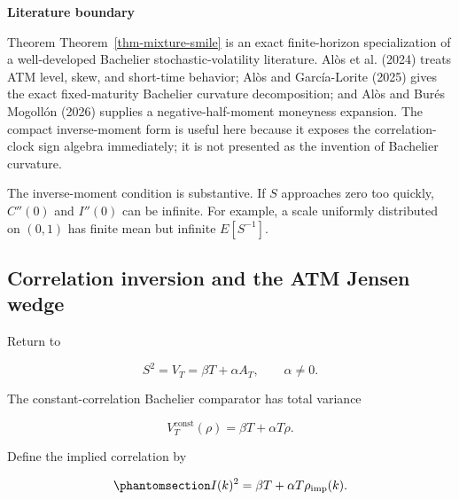 \documentclass[
  english,
  11pt,
  letterpaper,
  DIV=11,
  numbers=noendperiod]{scrartcl}
\theoremstyle{plain}
\theoremstyle{plain}
\theoremstyle{plain}
\theoremstyle{plain}
\theoremstyle{remark}
\begin{document}
\begin{tcolorbox}[enhanced jigsaw, arc=.35mm, bottomrule=.15mm, breakable, colback=white, colframe=quarto-callout-important-color-frame, left=2mm, leftrule=.75mm, opacityback=0, rightrule=.15mm, toprule=.15mm]
\begin{minipage}[t]{5.5mm}
\textcolor{quarto-callout-important-color}{\faExclamation}
\end{minipage}%
\begin{minipage}[t]{\textwidth - 5.5mm}

\vspace{-3mm}\textbf{Literature boundary}\vspace{3mm}

Theorem Theorem~\ref{thm-mixture-smile} is an exact finite-horizon
specialization of a well-developed Bachelier stochastic-volatility
literature. Alòs et al. (2024) treats ATM level, skew, and short-time
behavior; Alòs and García-Lorite (2025) gives the exact fixed-maturity
Bachelier curvature decomposition; and Alòs and Burés Mogollón (2026)
supplies a negative-half-moment moneyness expansion. The compact
inverse-moment form is useful here because it exposes the
correlation-clock sign algebra immediately; it is not presented as the
invention of Bachelier curvature.

\end{minipage}%
\end{tcolorbox}

The inverse-moment condition is substantive. If \(S\) approaches zero
too quickly, \(C''(0)\) and \(I''(0)\) can be infinite. For example, a
scale uniformly distributed on \((0,1)\) has finite mean but infinite
\(E[S^{-1}]\).

\subsection{Correlation inversion and the ATM Jensen
wedge}\label{correlation-inversion-and-the-atm-jensen-wedge}

Return to

\[
S^2=V_T=\beta T+\alpha A_T,
\qquad \alpha\ne0.
\]

The constant-correlation Bachelier comparator has total variance

\[
V_T^{\mathrm{const}}(\rho)=\beta T+\alpha T\rho.
\]

Define the implied correlation by

\begin{equation}\protect\phantomsection\label{eq-implied-correlation}{
I(k)^2=\beta T+\alpha T\rho_{\mathrm{imp}}(k).
}\end{equation}
\end{document}
